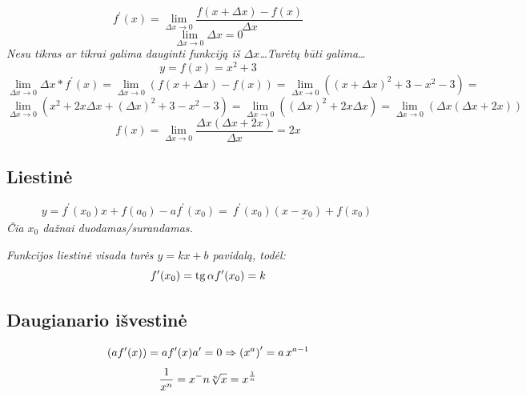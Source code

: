 \begin{equation}
    f^\prime(x) = \lim_{\Delta x \rightarrow 0} \frac{f(x + \Delta x) - f(x)}{\Delta x}
\end{equation}
\begin{equation}
    \lim_{\Delta x \rightarrow 0} \Delta x = 0
\end{equation}
\textit{Nesu tikras ar tikrai galima dauginti funkciją iš $\Delta x$\dots Turėtų būti galima\dots}
\begin{equation}
    y = f(x) = x^2 + 3
\end{equation}
\begin{equation}
     \lim_{\Delta x \rightarrow 0} \Delta x * f^\prime(x) = 
     \lim_{\Delta x \rightarrow 0} (f(x + \Delta x) - f(x)) = 
    \lim_{\Delta x \rightarrow 0} ((x + \Delta x)^2 + 3 - x^2 - 3) = 
\end{equation}
\begin{equation}
    \lim_{\Delta x \rightarrow 0} (x^2 + 2x\Delta x + (\Delta x)^2 + 3 - x^2 - 3) =
    \lim_{\Delta x \rightarrow 0} ((\Delta x)^2 + 2x\Delta x) = 
    \lim_{\Delta x \rightarrow 0} (\Delta x (\Delta x + 2x))
\end{equation}
\begin{equation}
    f(x) = \lim_{\Delta x \rightarrow 0} \frac{\Delta x (\Delta x + 2x)}{\Delta x} = 2x  
\end{equation}

\subsection{Liestinė}
\begin{equation}
    y = f^\prime(x_0)x + f(a_0) - af^\prime(x_0) =\underline{\ f^\prime(x_0)(x - x_0) + f(x_0)\ }
\end{equation}
\textit{Čia $x_0$ dažnai duodamas/surandamas.}

\textit{Funkcijos liestinė visada turės $y = kx + b$ pavidalą, todėl:}
\begin{equation}
    f^\prime(x_0) = \operatorname{tg} \alpha \\
    f^\prime(x_0) = k
\end{equation}

\subsection{Daugianario išvestinė}

\begin{equation}
    (af^\prime(x)) = af^\prime(x) \\
    a^\prime = 0 \Rightarrow {(x^a)}^\prime = a\,x^{a-1}
\end{equation}
\begin{equation}
    \frac{1}{x^n} = x^-n \\
    \sqrt[n]{x} = x^{\frac{1}{n}}
\end{equation}

